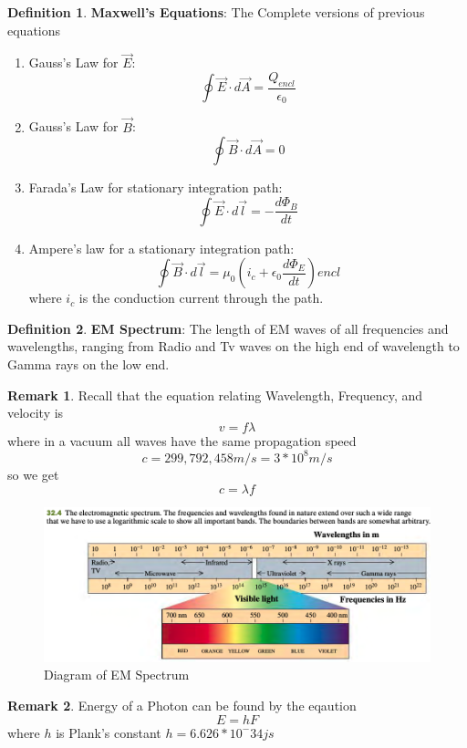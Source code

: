 \documentclass[12pt]{amsart}
\theoremstyle{definition}
\newtheorem{definition}{Definition} %
\newtheorem*{remark}{Remark}        %
\numberwithin{equation}{theorem}    %
\begin{document}
\begin{definition}
    \textbf{Maxwell's Equations}:
    The Complete versions of previous equations
    \begin{enumerate}
        \item Gauss's Law for $\vec{E}$: $$\oint \vec{E} \cdot d\vec{A} = \frac{Q_{encl}}{\epsilon_0}$$ 
        \item Gauss's Law for $\vec{B}$: $$\oint \vec{B} \cdot d\vec{A} = 0$$
        \item Farada's Law for stationary integration path:$$\oint \vec{E} \cdot d\vec{l} = -\frac{d\Phi_B}{dt}$$  
        \item Ampere’s law for a stationary integration path:
        $$\oint \vec{B} \cdot d\vec{l} = \mu_0 (i_c + \epsilon_0\frac{d\Phi_E}{dt})encl$$ where $i_c$ is the conduction current through the path.
    \end{enumerate}
\end{definition}

\begin{definition}
    \textbf{EM Spectrum}:
    The length of EM waves of all frequencies and wavelengths, ranging from Radio and Tv waves on the high end of wavelength to Gamma rays on the low end.
    \begin{remark}
        Recall that the equation relating Wavelength, Frequency, and velocity is $$v = f\lambda$$ where in a vacuum all waves have the same propagation speed $$c = 299,792,458 m/s = 3*10^8 m/s$$ so we get $$c = \lambda f$$
    \end{remark}
\end{definition}

\begin{figure}[H]
    \centering
    \includegraphics[width=5in]{Media/EMSpectrum.png}
    \caption{Diagram of EM Spectrum}
    \label{Diagram of EM Spectrum}
\end{figure}


\begin{remark}
    Energy of a Photon can be found by the eqaution $$E = hF$$ where $h$ is Plank's constant 
    $h = 6.626*10^-{34} js$
\end{remark}
\end{document}

